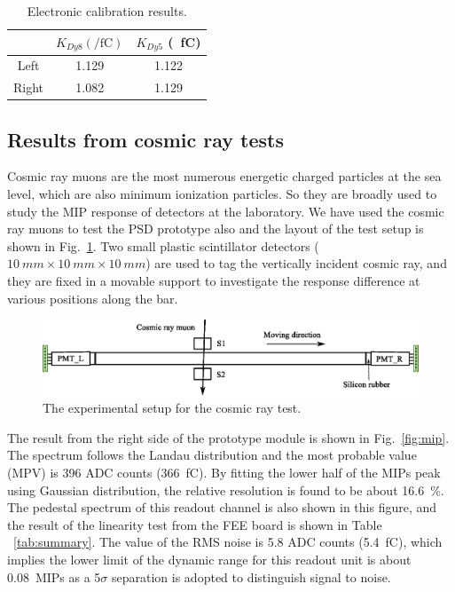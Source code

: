 \documentclass[preprint, times]{elsarticle}
\begin{document}
\begin{table}\footnotesize
	\centering
	\caption{Electronic calibration results. }
	\label{tab:calibration}
	\begin{tabulary}{80mm}{CCC}
		\toprule
		& $K_{Dy8} (\si{\per\femto\coulomb})$  & $K_{Dy5}$ (\si{\per\femto\coulomb}) \\
		\midrule
		Left  & 1.129 &  1.122\\
		Right  & 1.082 & 1.129\\
		\bottomrule
	\end{tabulary}
\end{table}

\subsection{Results from cosmic ray tests}
\label{sec:cosmicray}

Cosmic ray muons are the most numerous energetic charged particles at the sea level, which are also minimum ionization particles. So they are broadly used to study the MIP response of detectors at the laboratory.
We have used the cosmic ray muons to test the PSD prototype also and the layout of the test setup is shown in Fig.~\ref{fig:cosmic_test}.
Two small plastic scintillator detectors ($\SI{10}{mm} \times \SI{10}{mm} \times \SI{10}{mm}$) are used to tag the vertically incident cosmic ray, and they are fixed in a movable support to investigate the response difference at various positions along the bar.
\begin{figure}[h]
	\centering
	\includegraphics[width=130mm]{cosmic_test}
	\caption{The experimental setup for the cosmic ray test.}
	\label{fig:cosmic_test}
\end{figure}

The result from the right side of the prototype module is shown in Fig.~\ref{fig:mip}.
The spectrum follows the Landau distribution and the most probable value (MPV) is 396 ADC counts (\SI{366}{\femto\coulomb}).
By fitting the lower half of the MIPs peak using Gaussian distribution, the relative resolution is found to be about \SI{16.6}{\percent}.
The pedestal spectrum of this readout channel is also shown in this figure, and the result of the linearity test from the FEE board is shown in Table ~\ref{tab:summary}. The value of the RMS noise is 5.8 ADC counts (\SI{5.4}{\femto\coulomb}), which implies the lower limit of the dynamic range for this readout unit is about \SI{0.08}{MIPs} as a 5$\sigma$ separation is adopted to distinguish signal to noise.
\end{document}
